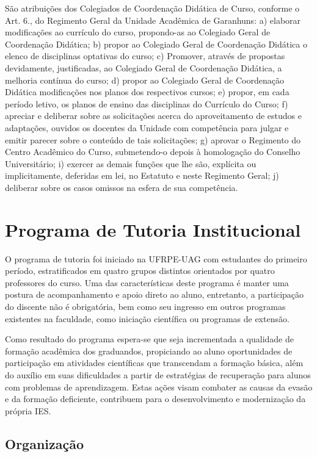 \documentclass[
	12pt,				%
	openright,			%
  oneside,     %
	a4paper,			%
	english,			%
	french,				%
	spanish,			%
	brazil				%
	]{abntex2}
\begin{document}
São atribuições dos Colegiados de Coordenação
Didática de Curso, conforme o Art. 6., do Regimento Geral da Unidade Acadêmica de Garanhuns: 
a) elaborar modificações ao currículo do curso,  propondo-as
ao Colegiado Geral de Coordenação Didática; b) propor ao Colegiado Geral de 
Coordenação Didática o elenco de disciplinas optativas do curso; c) Promover, 
através de propostas devidamente, justificadas, ao Colegiado Geral de
Coordenação Didática,  a melhoria contínua do curso; d) propor ao Colegiado
Geral de  Coordenação Didática modificações nos planos dos respectivos cursos; 
e) propor, em cada período letivo, os planos de ensino das disciplinas do
Currículo do Curso;  f) apreciar e deliberar sobre as solicitações acerca do 
aproveitamento de estudos e adaptações, ouvidos os docentes da Unidade com 
competência para julgar e emitir parecer sobre o conteúdo de tais solicitações; 
g) aprovar o Regimento do Centro Acadêmico do Curso, submetendo-o depois à 
homologação do Conselho Universitário; i) exercer as demais funções que lhe são,
explícita ou implicitamente, deferidas em lei, no Estatuto e neste Regimento
Geral;  j) deliberar sobre os casos omissos na esfera de sua competência.

\section{Programa de Tutoria Institucional}

O programa de tutoria foi iniciado na UFRPE-UAG com estudantes do primeiro período, estratificados em quatro grupos distintos orientados por quatro professores do curso. Uma das  características deste programa é manter uma postura de  acompanhamento e apoio direto ao aluno, entretanto, a participação do discente não é obrigatória, bem como seu ingresso em outros programas existentes na faculdade, como iniciação científica ou programas de extensão.

Como resultado do programa espera-se que seja incrementada a qualidade de formação acadêmica dos graduandos, propiciando ao aluno oportunidades de participação em atividades científicas que transcendam a formação básica, além do auxílio em suas dificuldades a partir de estratégias de recuperação para alunos com problemas de aprendizagem. Estas ações visam combater as causas da evasão e da formação deficiente, contribuem para o desenvolvimento e modernização da própria IES.

\subsection{Organização}
\end{document}
